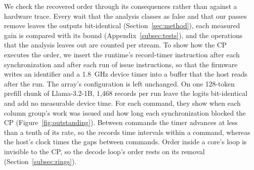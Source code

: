 We check the recovered order through its consequences rather than against a hardware trace.
Every wait that the analysis classes as false and that our passes remove leaves the outputs bit-identical (Section~\ref{sec:method}), each measured gain is compared with its bound (Appendix~\ref{subsec:tests}), and the operations that the analysis leaves out are counted per stream.
To show how the CP executes the order, we insert the runtime's record-timer instruction after each synchronization and after each run of issue instructions, so that the firmware writes an identifier and a 1.8~GHz device timer into a buffer that the host reads after the run.
The array's configuration is left unchanged.
On one 128-token prefill chunk of Llama-3.2-1B, 1{,}468 records per run leave the logits bit-identical and add no measurable device time.
For each command, they show when each column group's work was issued and how long each synchronization blocked the CP (Figure~\ref{fig:outstanding}).
Between commands the timer advances at less than a tenth of its rate, so the records time intervals within a command, whereas the host's clock times the gaps between commands.
Order inside a core's loop is invisible to the CP, so the decode loop's order rests on its removal (Section~\ref{subsec:rings}).


